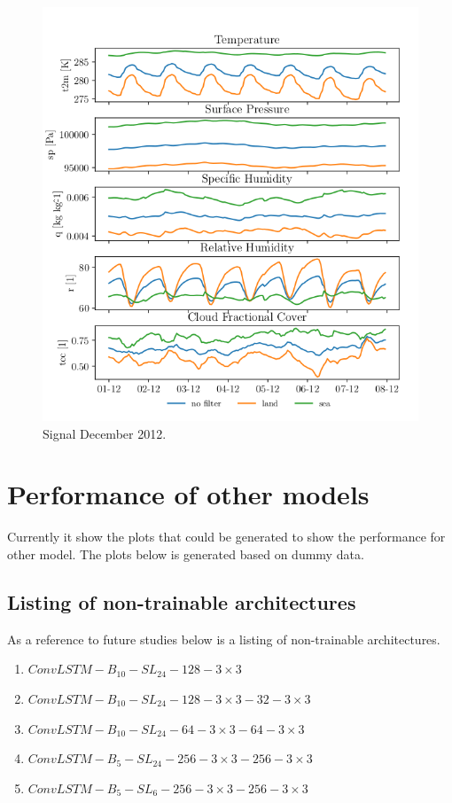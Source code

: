 \begin{figure}[ht]
    \centering
    \includegraphics{python_figs/spatially_averaged_one_week_from_2012-12-01.png}
    \caption{Signal December 2012.}
    \label{fig:dec12}
\end{figure}

\cleardoublepage
\chapter{Performance of other models} 
Currently it show the plots that could be generated to show the performance for other model. The plots below is generated based on dummy data. 

\section{Listing of non-trainable architectures} \label{app:list_non_trainable_architectures}
As a reference to future studies below is a listing of non-trainable architectures.
\begin{enumerate}
    \item $ConvLSTM-B_{10}-SL_{24}-128-3\times3$
    \item $ConvLSTM-B_{10}-SL_{24}-128-3\times3-32-3\times3$
    \item $ConvLSTM-B_{10}-SL_{24}-64-3\times3-64-3\times3$
    \item $ConvLSTM-B_{5}-SL_{24}-256-3\times3-256-3\times3$
    \item $ConvLSTM-B_{5}-SL_{6}-256-3\times3-256-3\times3$
\end{enumerate}

